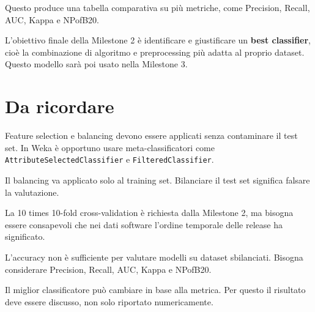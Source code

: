 Questo produce una tabella comparativa su più metriche, come Precision, Recall, AUC, Kappa e NPofB20.

\begin{notaesame}
L'obiettivo finale della Milestone 2 è identificare e giustificare un \textbf{best classifier}, cioè la combinazione di algoritmo e preprocessing più adatta al proprio dataset. Questo modello sarà poi usato nella Milestone 3.
\end{notaesame}

\section{Da ricordare}

\begin{notaesame}
Feature selection e balancing devono essere applicati senza contaminare il test set. In Weka è opportuno usare meta-classificatori come \texttt{AttributeSelectedClassifier} e \texttt{FilteredClassifier}.
\end{notaesame}

\begin{notaesame}
Il balancing va applicato solo al training set. Bilanciare il test set significa falsare la valutazione.
\end{notaesame}

\begin{notaesame}
La 10 times 10-fold cross-validation è richiesta dalla Milestone 2, ma bisogna essere consapevoli che nei dati software l'ordine temporale delle release ha significato.
\end{notaesame}

\begin{notaesame}
L'accuracy non è sufficiente per valutare modelli su dataset sbilanciati. Bisogna considerare Precision, Recall, AUC, Kappa e NPofB20.
\end{notaesame}

\begin{notaesame}
Il miglior classificatore può cambiare in base alla metrica. Per questo il risultato deve essere discusso, non solo riportato numericamente.
\end{notaesame}